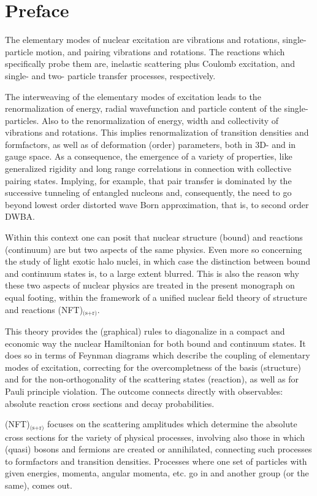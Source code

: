  \chapter*{Preface}\label{preface}
The elementary modes of nuclear excitation are vibrations and rotations, single-particle  motion, and pairing vibrations and rotations. The reactions which specifically probe  them  are, inelastic scattering plus Coulomb excitation, and single- and two- particle transfer processes, respectively. 

The interweaving of the elementary modes of excitation leads to the renormalization of  energy, radial wavefunction and particle content of the single-particles. Also to the renormalization of energy, width and collectivity of vibrations and rotations. This implies renormalization of transition densities and formfactors, as well as of deformation (order) parameters, both in 3D- and in gauge space. As a consequence, the emergence of a variety of properties, like generalized rigidity and long range correlations in connection with collective pairing states.  Implying, for example, that pair transfer is dominated by the successive tunneling of entangled nucleons and, consequently, the need to go beyond lowest order distorted wave Born approximation, that is, to second order DWBA.    

Within this context one can posit that nuclear structure (bound) and reactions (continuum) are but two aspects of the same physics.  Even more so concerning the study of light exotic halo nuclei, in which case the distinction between bound and continuum states is, to a large extent blurred. This is also the reason why these two aspects of nuclear physics are treated in the present monograph on equal footing,  within the framework of a unified nuclear field theory of structure and reactions (NFT)$_\text{(s+r)}$. 


This theory provides the (graphical) rules to diagonalize in a compact and economic way the nuclear Hamiltonian for both bound and continuum states. It does so in terms of Feynman diagrams which describe the coupling of elementary modes of excitation, correcting for the overcompletness of the basis  (structure) and for the  non-orthogonality of the scattering states (reaction), as well as for Pauli principle violation. The outcome connects directly with observables: absolute reaction cross sections and decay probabilities. 


(NFT)$_\text{(s+r)}$ focuses on the scattering amplitudes which determine the absolute cross sections for the variety of physical processes, involving also those in which (quasi) bosons and fermions are created or annihilated, connecting such processes to formfactors and transition densities. Processes where one set of particles with given energies, momenta, angular momenta, etc. go in and another group (or the same), comes out. 

